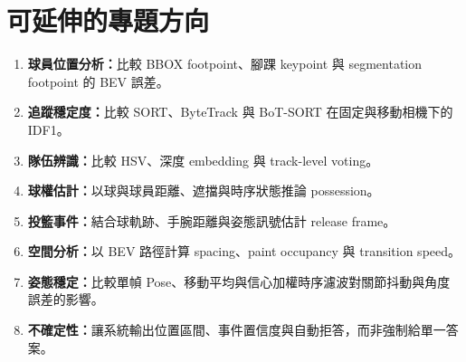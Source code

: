 \documentclass[11pt,a4paper,oneside]{report}
\begin{document}
\chapter{可延伸的專題方向}

\begin{enumerate}
  \item \textbf{球員位置分析：}比較 BBOX footpoint、腳踝 keypoint 與 segmentation footpoint 的 BEV 誤差。
  \item \textbf{追蹤穩定度：}比較 SORT、ByteTrack 與 BoT-SORT 在固定與移動相機下的 IDF1。
  \item \textbf{隊伍辨識：}比較 HSV、深度 embedding 與 track-level voting。
  \item \textbf{球權估計：}以球與球員距離、遮擋與時序狀態推論 possession。
  \item \textbf{投籃事件：}結合球軌跡、手腕距離與姿態訊號估計 release frame。
  \item \textbf{空間分析：}以 BEV 路徑計算 spacing、paint occupancy 與 transition speed。
  \item \textbf{姿態穩定：}比較單幀 Pose、移動平均與信心加權時序濾波對關節抖動與角度誤差的影響。
  \item \textbf{不確定性：}讓系統輸出位置區間、事件置信度與自動拒答，而非強制給單一答案。
\end{enumerate}
\end{document}
